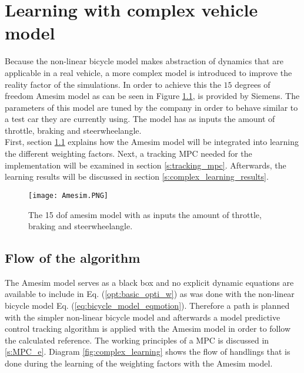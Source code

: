 \chapter{Learning with complex vehicle model}
\label{cha:Tracking_MPC}


Because the non-linear bicycle model makes abstraction of dynamics that are applicable in a real vehicle, a more complex model is introduced to improve the reality factor of the simulations. In order to achieve this the $15$ degrees of freedom Amesim model as can be seen in Figure \ref{fig:Amesim}, is provided by Siemens. The parameters of this model are tuned by the company in order to behave similar to a test car they are currently using. The model has as inputs the amount of throttle, braking and steerwheelangle.\\

First, section \ref{s:flow of the algorithm} explains how the Amesim model will be integrated into learning the different weighting factors. Next, a tracking MPC needed for the implementation will be examined in section \ref{s:tracking_mpc}. Afterwards, the learning results will be discussed in section \ref{s:complex_learning_results}.

\begin{figure}[h!]
	\centering
	\texttt{[image: Amesim.PNG]}
	\caption{The 15 dof amesim model with as inputs the amount of throttle, braking and steerwheelangle.}	
	\label{fig:Amesim}
\end{figure}
\newpage
\section{Flow of the algorithm}
\label{s:flow of the algorithm}
The Amesim model serves as a black box and no explicit dynamic equations are available 
to include in Eq. (\ref{opt:basic_opti_w}) as was done with the non-linear bicycle model Eq. (\ref{eq:bicycle_model_eqmotion}). Therefore a path is planned with the simpler non-linear bicycle model and afterwards a model predictive control tracking algorithm is applied with the Amesim model in order to follow the calculated reference. The working principles of a MPC is discussed in \ref{s:MPC_e}. Diagram \ref{fig:complex_learning} shows the flow of handlings that is done during the learning of the weighting factors with the Amesim model.

